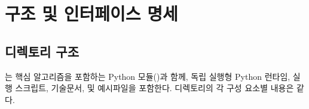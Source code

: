 \part{구조 및 인터페이스 명세}
\label{part:ioref}


\chapter{디렉토리 구조}
\simulator 는 핵심 알고리즘을 포함하는 Python 모듈(\pymodule)과 함께, 독립 실행형 Python 런타임, 실행 스크립트, 기술문서, 및 예시파일을 포함한다.
디렉토리의 각 구성 요소별 내용은 \과 같다.

